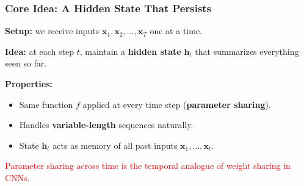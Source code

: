\documentclass[notes,11pt, aspectratio=169]{beamer}
\newcommand{\vx}{\mathbf{x}}
\newcommand{\vh}{\mathbf{h}}
\begin{document}
\begin{frame}
\frametitle{Core Idea: A Hidden State That Persists}

\textbf{Setup:} we receive inputs $\vx_1, \vx_2, \ldots, \vx_T$ one at a time.

\vspace{6pt}
\textbf{Idea:} at each step $t$, maintain a \textbf{hidden state} $\vh_t$ that summarizes everything seen so far.

\vspace{6pt}

\vspace{8pt}
\textbf{Properties:}
\begin{itemize}
    \item Same function $f$ applied at every time step (\textbf{parameter sharing}).
    \item Handles \textbf{variable-length} sequences naturally.
    \item State $\vh_t$ acts as memory of all past inputs $\vx_1, \ldots, \vx_t$.
\end{itemize}

\vspace{4pt}
\textcolor{red}{Parameter sharing across time is the temporal analogue of weight sharing in CNNs.}
\end{frame}
\end{document}

